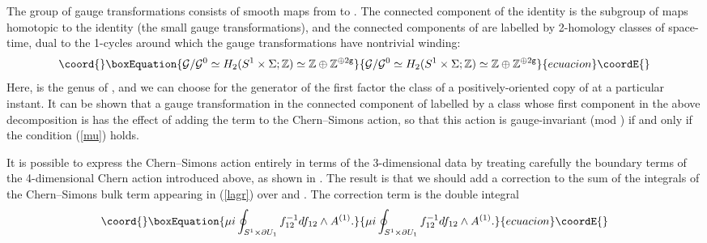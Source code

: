 \documentclass[a4paper,11pt]{article}
\begin{document}
The group of gauge transformations \coordHE{} consists of smooth maps 
from \coordHE{} to \coordHE{}. The connected component of the 
identity \coordHE{} is the subgroup of maps homotopic to the
identity (the small gauge transformations), and the connected
components of \coordHE{} are labelled
by 2-homology classes of space-time, dual to the 1-cycles around which
the gauge transformations have nontrivial winding:
\begin{equation}\coord{}\boxEquation{\label{ccompts}
{\cal G}/{\cal G}^{0}\simeq H_{2}(S^{1}\times \Sigma; \mathbb{Z})
\simeq \mathbb{Z} \oplus \mathbb{Z}^{\oplus 2 {\tt g}}
}{{\cal G}/{\cal G}^{0}\simeq H_{2}(S^{1}\times \Sigma; \mathbb{Z})
\simeq \mathbb{Z} \oplus \mathbb{Z}^{\oplus 2 {\tt g}}
}{ecuacion}\coordE{}\end{equation}
Here, \coordHE{} is the genus of \myHighlight{$\Sigma$}\coordHE{}, and we can choose for the 
generator \myHighlight{${\sigma}$}\coordHE{} of the first \coordHE{} factor the class of a
positively-oriented copy of \myHighlight{$\Sigma$}\coordHE{} at a particular instant. It can
be shown \cite{DGS}
that a gauge transformation in the connected component of \coordHE{}
labelled by a class whose first component in the above decomposition
is \coordHE{} has the effect of adding the term \coordHE{} to
the Chern--Simons action, so that this action is gauge-invariant 
(mod \myHighlight{$2\pi$}\coordHE{}) if and only if the condition (\ref{mu}) holds.


It is possible to express the Chern--Simons action entirely in terms
of the 3-dimensional data by treating carefully the boundary terms
of the 4-dimensional Chern action introduced above, as shown in \cite{DGS}. 
The result is that we should add a correction to the sum of the 
integrals of the Chern--Simons bulk term appearing in (\ref{lagr})
over \coordHE{} and \coordHE{}. The correction term is the double integral
\begin{equation}\coord{}\boxEquation{ \label{correct}
\mu i \oint_{S^{1}\times \partial U_{1}}f_{12}^{-1}df_{12}\wedge A^{(1)}.
}{ \mu i \oint_{S^{1}\times \partial U_{1}}f_{12}^{-1}df_{12}\wedge A^{(1)}.
}{ecuacion}\coordE{}\end{equation}
\end{document}
